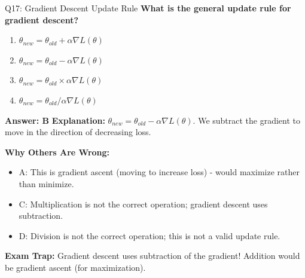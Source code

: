 \documentclass[8pt]{beamer}
\begin{document}
	\begin{frame}{Q17: Gradient Descent Update Rule}
		\fontsize{6.5}{7.5}\selectfont
		\textbf{What is the general update rule for gradient descent?}
		
		\begin{enumerate}
			\item $\theta_{new} = \theta_{old} + \alpha \nabla L(\theta)$
			\item $\theta_{new} = \theta_{old} - \alpha \nabla L(\theta)$
			\item $\theta_{new} = \theta_{old} \times \alpha \nabla L(\theta)$
			\item $\theta_{new} = \theta_{old} / \alpha \nabla L(\theta)$
		\end{enumerate}
		
		\vspace{0.05cm}
		\textcolor{myblue}{\textbf{Answer: B}}
		\vspace{0.05cm}
		\textcolor{myblue}{\textbf{Explanation:}} $\theta_{new} = \theta_{old} - \alpha \nabla L(\theta)$. We subtract the gradient to move in the direction of decreasing loss.
		
		\vspace{0.05cm}
		\textcolor{myred}{\textbf{Why Others Are Wrong:}}
		\begin{itemize}
			\item \textcolor{myred}{A:} This is gradient ascent (moving to increase loss) - would maximize rather than minimize.
			\item \textcolor{myred}{C:} Multiplication is not the correct operation; gradient descent uses subtraction.
			\item \textcolor{myred}{D:} Division is not the correct operation; this is not a valid update rule.
		\end{itemize}
		
		\textcolor{myred}{\textbf{Exam Trap:}} Gradient descent uses \textcolor{myblue}{subtraction} of the gradient! Addition would be gradient ascent (for maximization).
	\end{frame}
	
\end{document}
